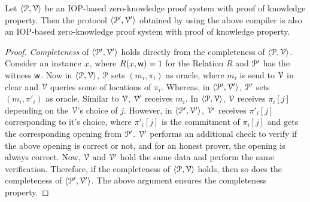 \begin{lemma}\label{lemma:compiler}
	Let $\langle \mathcal{P},\mathcal{V}\rangle$ be an IOP-based zero-knowledge proof system with proof of knowledge property. Then the protocol $\langle \mathcal{P}',\mathcal{V}'\rangle$ obtained by using the above compiler is also an IOP-based zero-knowledge proof system with proof of knowledge property.
\end{lemma}
\begin{proof}
	
%	
%	
	
	
	
	
	\textit{Completeness} of $\langle \mathcal{P}', \mathcal{V}' \rangle$ holds directly from the completeness of $\langle \mathcal{P}, \mathcal{V} \rangle$. 
	Consider an instance ${x}$, where $R({x},\mathsf{w}) = 1$ for the Relation $R$ and $\mathcal{P}'$ has the witness $\mathsf{w}$. 
	Now in $\langle \mathcal{P},\mathcal{V}\rangle$, $\mathcal{P}$ sets $(m_i, \pi_i)$ as oracle, where $m_i$ is send to $\mathcal{V}$ in clear and $\mathcal{V}$ queries some of locations of $\pi_i$. Whereas, in $\langle \mathcal{P}',\mathcal{V}'\rangle$, $\mathcal{P}'$ sets $(m_i, \pi'_i)$ as oracle. 
	Similar to $\mathcal{V}$, $\mathcal{V}'$ receives $m_i$. In $\langle \mathcal{P},\mathcal{V}\rangle$, $\mathcal{V}$ receives $\pi_i[j]$ depending on the $\mathcal{V}$'s choice of $j$. 
	However, in $\langle \mathcal{P}',\mathcal{V}'\rangle$, $\mathcal{V}'$ receives $\pi'_i[j]$ corresponding to it's choice, where $\pi'_i[j]$ is the commitment of $\pi_i[j]$ and gets the corresponding opening from $\mathcal{P}'$. 
	$\mathcal{V}'$ performs an additional check to verify if the above opening is correct or not, and for an honest prover, the opening is always correct.
	Now, $\mathcal{V}$ and $\mathcal{V}'$ hold the same data and perform the same verification. 
	Therefore, if the completeness of $\langle \mathcal{P},\mathcal{V}\rangle$ holds, then so does the completeness of $\langle \mathcal{P}',\mathcal{V}'\rangle$.
	The above argument ensures the completeness property.
	

\end{proof}
